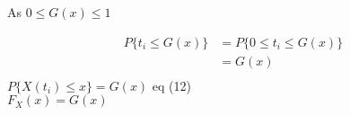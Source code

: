 \documentclass{beamer}
\begin{document}
            \begin{frame}
            As $0 \le G(x) \le 1$
            
            \begin{align}
            P\{t_i \le G(x)\} &= P\{0 \le t_i \le G(x)\}\\
            &= G(x)\\
            \end{align}
        $P\{X(t_i) \le x\}=G(x)$  \because  eq (12)\\
 \therefore $F_X(x)=G(x)$
  \end{frame}
  
 
\end{document}
